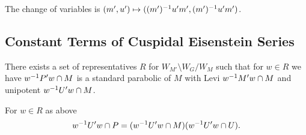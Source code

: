     The change of variables is \((m', u') \mapsto ((m')^{-1} u' m', (m')^{-1} u' m')\).

\subsection{Constant Terms of Cuspidal Eisenstein Series}
\begin{Lemma}\label{lem:4}
        There exists a set of representatives \(R\) for \( W_{M'}\setminus W_G / W_{M} \) such that for \(w\in R\) we have  \(w^{-1} P'w\cap M\) is a standard parabolic of \(M\) with Levi \(w^{-1} M'w\cap M\) and unipotent \(w^{-1} U'w\cap M\).
    \end{Lemma}
    \begin{Lemma}\label{lem:5}
    	For \(w\in R\) as above
        \[w^{-1} U' w \cap P = (w^{-1} U' w \cap M)(w^{-1} U' w \cap U).\]
    \end{Lemma}
    

